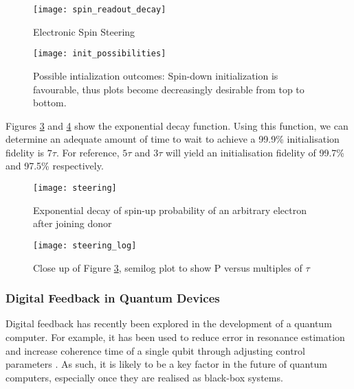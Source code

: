 	\begin{figure}[htbp!]
		\centering
		\texttt{[image: spin\_readout\_decay]}
		\caption{Electronic Spin Steering}
		\label{fig::spin_readout_decay}
	\end{figure}
	
	\begin{figure}[htbp!]
		\centering
		\texttt{[image: init\_possibilities]}
		\caption[Possible initialisation outcomes]{Possible intialization outcomes: Spin-down initialization is favourable, thus plots become decreasingly desirable from top to bottom.}
		\label{fig::init_possibilities}
	\end{figure}
	
	Figures \ref{fig::spin_steering} and \ref{fig::spin_steering_log} show the exponential decay function. Using this function, we can determine an adequate amount of time to wait to achieve a 99.9\% initialisation fidelity is $7 \tau$. For reference, $5 \tau$ and $3 \tau$ will yield an initialisation fidelity of 99.7\% and 97.5\% respectively.
	
	\begin{figure}[htbp!]
		\centering
		\texttt{[image: steering]}
		\caption{Exponential decay of spin-up probability of an arbitrary electron after joining donor}
		\label{fig::spin_steering}
	\end{figure}
	
	
	\begin{figure}[htbp!]
		\centering
		\texttt{[image: steering\_log]}
		\caption{Close up of Figure \ref{fig::spin_steering}, semilog plot to show P versus multiples of $\tau$}
		\label{fig::spin_steering_log}
	\end{figure}


\subsubsection{Digital Feedback in Quantum Devices}

Digital feedback has recently been explored in the development of a quantum computer. For example, it has been used to reduce error in resonance estimation \cite{bonato2015optimized} and increase coherence time of a single qubit through adjusting control parameters \cite{shulman2014suppressing}. As such, it is likely to be a key factor in the future of quantum computers, especially once they are realised as black-box systems.

